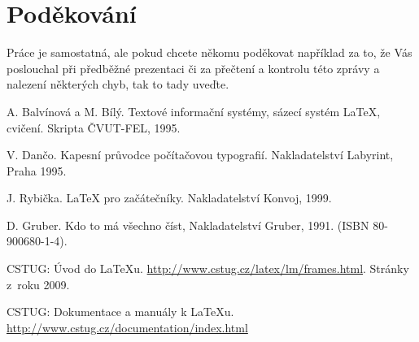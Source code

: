 \documentclass[report,11pt]{elsarticle}
\begin{document}
\section*{\label{SEC:ACK}Poděkování}

Práce je samostatná, ale pokud chcete někomu poděkovat například za
to, že Vás poslouchal při předběžné prezentaci či za přečtení a
kontrolu této zprávy a nalezení některých chyb, tak to tady uveďte.


%
%
%

\label{SEC:References}
\renewcommand\bibname{References}
\begin{thebibliography}{10}

A. Balvínová a M. Bílý.
\newblock Textové informační systémy, sázecí systém \LaTeX, cvičení.
Skripta ČVUT-FEL, 1995.

V. Dančo.
\newblock Kapesní průvodce počítačovou typografií. Nakladatelství
Labyrint, Praha 1995.

J. Rybička.
\newblock \LaTeX\/ pro začátečníky. Nakladatelství Konvoj, 1999.

D. Gruber.
\newblock Kdo to má všechno číst, Nakladatelství Gruber, 1991.
(ISBN 80-900680-1-4).

 CSTUG: Úvod do \LaTeX{u}.
\newblock
\url{http://www.cstug.cz/latex/lm/frames.html}. Stránky z~roku 2009.

CSTUG: Dokumentace a manuály k \LaTeX{u}.
\newblock \url{http://www.cstug.cz/documentation/index.html}

\end{thebibliography}
\end{document}
